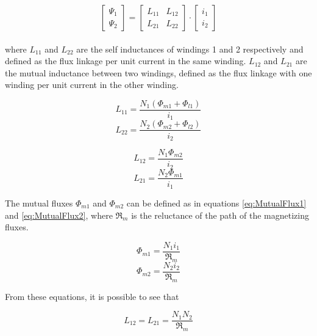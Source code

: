 \begin{equation} \label{eq:FluxLinkageInductances}
	\begin{bmatrix}
		\Psi_1\\
		\Psi_2
	\end{bmatrix}
		=
	\begin{bmatrix}
		L_{11} & L_{12}\\
		L_{21} & L_{22}
	\end{bmatrix}
		\cdot
	\begin{bmatrix}
		i_1\\
		i_2		
	\end{bmatrix}
\end{equation}
\\
where $L_{11}$ and $L_{22}$ are the self inductances of windings 1 and 2 respectively and defined as the flux linkage per unit current in the same winding. $L_{12}$ and $L_{21}$ are the mutual inductance between two windings, defined as the flux linkage with one winding per unit current in the other winding.

\begin{equation}
	L_{11} = \frac{N_1(\Phi_{m1} + \Phi_{l1})}{i_1}
\end{equation}
\begin{equation}
	L_{22} =  \frac{N_2(\Phi_{m2} + \Phi_{l2})}{i_2}
\end{equation}

\begin{equation}
	L_{12} = \frac{N_1 \Phi_{m2}}{i_2}
\end{equation}
\begin{equation}
	L_{21} = \frac{N_2 \Phi_{m1}}{i_1}
\end{equation}

The mutual fluxes $\Phi_{m1}$ and $\Phi_{m2}$ can be defined as in equations \ref{eq:MutualFlux1} and \ref{eq:MutualFlux2}, where $\Re_m$ is the reluctance of the path of the magnetizing fluxes. 

\begin{equation} \label{eq:MutualFlux1}
	\Phi_{m1} = \frac{N_1 i_1}{\Re_m} 
\end{equation} 
\begin{equation} \label{eq:MutualFlux2}
	\Phi_{m2} = \frac{N_2 i_2}{\Re_m} 
\end{equation}

From these equations, it is possible to see that

\begin{equation}
	L_{12}=L_{21}= \frac{N_1 N_2}{\Re_m}
\end{equation}


